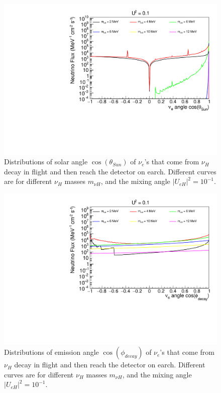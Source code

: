 \documentclass[%
 reprint,
 amsmath,amssymb,
 aps,
 prd,
twocolumn,
]{revtex4-1}
\begin{document}
\begin{figure}[!ht]
\includegraphics[width=0.99\columnwidth]{../plots/DecayInFlightNuLCosthetaSun_U0.1_AllMass_linXlogY.pdf}
\caption{Distributions of solar angle $\cos(\theta_{Sun})$ of $\nu_e$'s that come from $\nu_H$ decay in flight and then reach the detector on earch. Different curves are for different $\nu_H$ masses $m_{\nu H}$, and the mixing angle $|U_{eH}|^2 = 10^{-1}$.}
\label{fig:DecayInFlightTheta_U1em1_AllMass}
\end{figure}

\begin{figure}[!ht]
\includegraphics[width=0.99\columnwidth]{../plots/DecayInFlightNuLCosphiSun_U0.1_AllMass_linXlogY.pdf}
\caption{Distributions of emission angle $\cos(\phi_{decay})$ of $\nu_e$'s that come from $\nu_H$ decay in flight and then reach the detector on earch. Different curves are for different $\nu_H$ masses $m_{\nu H}$, and the mixing angle $|U_{eH}|^2 = 10^{-1}$.}
\label{fig:DecayInFlightPhi_U1em1_AllMass}
\end{figure}
\end{document}
